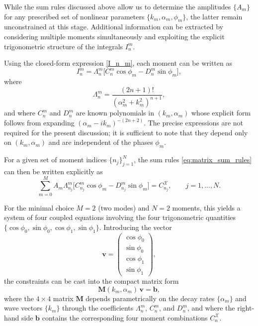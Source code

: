 \documentclass[aps,onecolumn]{revtex4-2}
\begin{document}
While the sum rules discussed above allow us to determine the amplitudes
$\{A_m\}$ for any prescribed set of nonlinear parameters
$\{k_m,\alpha_m,\phi_m\}$, the latter remain unconstrained at this stage.
Additional information can be extracted by considering multiple moments
simultaneously and exploiting the explicit trigonometric structure of the
integrals $I_n^m$.

Using the closed-form expression \eqref{I_n_m}, each moment can be written as
\begin{equation}
    I_n^m
    =
    \Lambda_n^m
    \Big[
        C_n^m \cos\phi_m
        -
        D_n^m \sin\phi_m
        \Big],
\end{equation}
where
\[
    \Lambda_n^m = \frac{(2n+1)!}{(\alpha_m^2+k_m^2)^{n+1}},
\]
and where $C_n^m$ and $D_n^m$ are known polynomials in $(k_m,\alpha_m)$ whose
explicit form follows from expanding $(\alpha_m-ik_m)^{-(2n+2)}$.
The precise expressions are not required for the present discussion; it is
sufficient to note that they depend only on $(k_m,\alpha_m)$ and are independent
of the phases $\phi_m$.

For a given set of moment indices $\{n_j\}_{j=1}^N$, the sum rules
\eqref{eq:matrix_sum_rules} can then be written explicitly as
\begin{equation}
    \sum_{m=0}^M
    A_m \Lambda_{n_j}^m
    \bigl[
        C_{n_j}^m \cos\phi_m
        -
        D_{n_j}^m \sin\phi_m
        \bigr]
    =
    C_{n_j}^{\mathcal X},
    \qquad j=1,\dots,N.
\end{equation}

For the minimal choice $M=2$ (two modes) and $N=2$ moments, this yields a system
of four coupled equations involving the four trigonometric quantities
$\{\cos\phi_0,\sin\phi_0,\cos\phi_1,\sin\phi_1\}$. Introducing the vector
\[
    \mathbf v =
    \begin{pmatrix}
        \cos\phi_0 \\
        \sin\phi_0 \\
        \cos\phi_1 \\
        \sin\phi_1
    \end{pmatrix},
\]
the constraints can be cast into the compact matrix form
\begin{equation}
    \mathbf M(k_m,\alpha_m)\,\mathbf v = \mathbf b,
    \label{eq:nonlinear_matrix}
\end{equation}
where the $4\times4$ matrix $\mathbf M$ depends parametrically on the decay
rates $\{\alpha_m\}$ and wave vectors $\{k_m\}$ through the coefficients
$\Lambda_n^m$, $C_n^m$, and $D_n^m$, and where the right-hand side $\mathbf b$
contains the corresponding four moment combinations $C_n^{\mathcal X}$.
\end{document}
